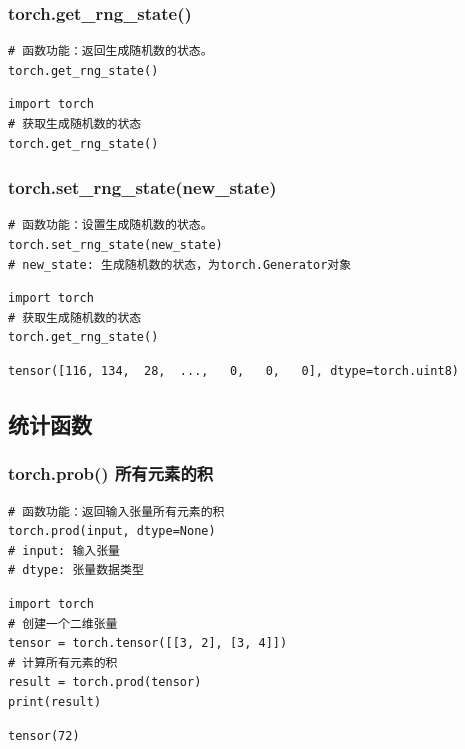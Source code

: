 \subsubsection{torch.get\_rng\_state()}
\begin{lstlisting}[style=demostyle,numbers=none] 
# 函数功能：返回生成随机数的状态。
torch.get_rng_state()
\end{lstlisting}
\begin{lstlisting}[style=pythonstyle]
import torch
# 获取生成随机数的状态
torch.get_rng_state()
\end{lstlisting}


\subsubsection{torch.set\_rng\_state(new\_state)}
\begin{lstlisting}[style=demostyle,numbers=none] 
# 函数功能：设置生成随机数的状态。
torch.set_rng_state(new_state)
# new_state: 生成随机数的状态，为torch.Generator对象
\end{lstlisting}
\begin{lstlisting}[style=pythonstyle]
import torch
# 获取生成随机数的状态
torch.get_rng_state()
\end{lstlisting}
\begin{lstlisting}[style=demostyle,numbers=none] 
tensor([116, 134,  28,  ...,   0,   0,   0], dtype=torch.uint8)
\end{lstlisting}        

\subsection{统计函数}
\subsubsection{torch.prob() 所有元素的积}
\begin{lstlisting}[style=demostyle,numbers=none]
# 函数功能：返回输入张量所有元素的积
torch.prod(input, dtype=None)
# input: 输入张量
# dtype: 张量数据类型
\end{lstlisting}
\begin{lstlisting}[style=pythonstyle]
import torch
# 创建一个二维张量
tensor = torch.tensor([[3, 2], [3, 4]])
# 计算所有元素的积
result = torch.prod(tensor)
print(result)
\end{lstlisting}
\begin{lstlisting}[style=demostyle,numbers=none] 
tensor(72)
\end{lstlisting}

